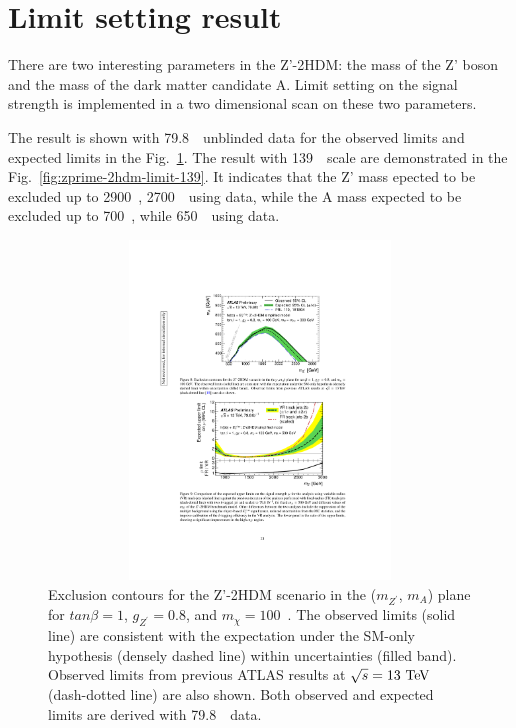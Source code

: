 \section{Limit setting result}
\label{sec:limitres}

\par There are two interesting parameters in the Z'-2HDM: the mass of the Z' boson and the mass of the dark matter candidate A. 
Limit setting on the signal strength is implemented in a two dimensional scan on these two parameters.

\par The result is shown with 79.8~\ifb~unblinded data for the observed limits and expected limits in the Fig.~\ref{fig:zprime-2hdm-limit-80}. 
The result with 139~\ifb~scale are demonstrated in the Fig.~\ref{fig:zprime-2hdm-limit-139}. 
It indicates that the Z' mass epected to be excluded up to 2900~\GeV, 2700~\GeV~using data, while the A mass expected to be excluded up to 700~\GeV, while 650~\GeV~using data.

\begin{figure}[!htb]
    \centering
    \includegraphics[width=12cm, height=9cm, trim={6cm 17cm 5.8cm 4.5cm}, clip]{chapters/c9/figures/ZPrime2HDMLimit-80Exp.pdf}
    \caption{Exclusion contours for the Z'-2HDM scenario in the ($m_{Z^{\prime}}$, $m_{A}$) plane for $tan\beta= 1$, $g_{Z^{\prime}}=0.8$, and $m_{\chi}=100$~\GeV. 
    The observed limits (solid line) are consistent with the expectation under the SM-only hypothesis (densely dashed line) within uncertainties (filled band). 
     Observed limits from previous ATLAS results at $\sqrt{s}=13~\text{Te\kern -0.1em V}$ (dash-dotted line) are also shown. Both observed and expected limits are derived with 79.8~\ifb~data.}
    \label{fig:zprime-2hdm-limit-80}
\end{figure}



